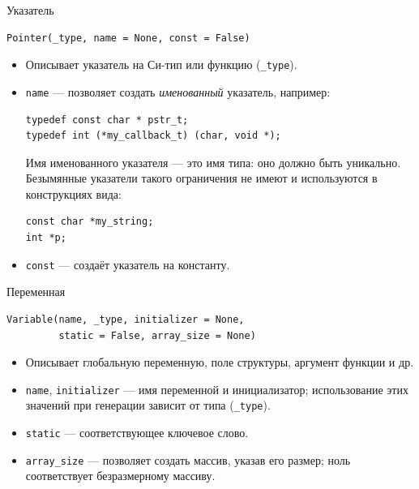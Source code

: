 \documentclass[unicode,hyperref={unicode=true}]{beamer}
\theoremstyle{definition}
\theoremstyle{plain}
\begin{document}
\begin{frame}[fragile]{Указатель}
\lstset{language=Python}
\begin{lstlisting}
Pointer(_type, name = None, const = False)
\end{lstlisting}
\vfill
\begin{itemize}
\item Описывает указатель на Си-тип или функцию (\texttt{\_type}).
\item \texttt{name} --- позволяет создать \textit{именованный} указатель,
    например:\\

\lstset{language=C}
\begin{lstlisting}
typedef const char * pstr_t;
typedef int (*my_callback_t) (char, void *);
\end{lstlisting}

    Имя именованного указателя --- это имя типа: оно должно быть уникально.
    Безымянные указатели такого ограничения не имеют и используются в
    конструкциях вида:

\lstset{language=C}
\begin{lstlisting}
const char *my_string;
int *p;
\end{lstlisting}


\item \texttt{const} --- создаёт указатель на константу.
\end{itemize}
\end{frame}



\begin{frame}[fragile]{Переменная}
\lstset{language=Python}
\begin{lstlisting}
Variable(name, _type, initializer = None,
         static = False, array_size = None)
\end{lstlisting}
\vfill
\begin{itemize}
\item Описывает глобальную переменную, поле структуры, аргумент функции и др.
\item \texttt{name}, \texttt{initializer} --- имя переменной и инициализатор;
    использование этих значений при генерации зависит от типа (\texttt{\_type}).
\item \texttt{static} --- соответствующее ключевое слово.
\item \texttt{array\_size} --- позволяет создать массив, указав его размер;
    ноль соответствует безразмерному массиву.
\end{itemize}
\end{frame}
\end{document}

